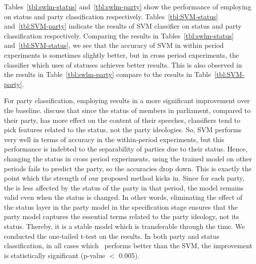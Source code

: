 



Tables~\ref{tbl:swlm-status} and~\ref{tbl:swlm-party} show the performance of employing \acswlm on status and party classification respectively. 
Tables~\ref{tbl:SVM-status} and~\ref{tbl:SVM-party} indicate the results of SVM classifier on status and party classification respectively. Comparing the results in Tables~\ref{tbl:swlm-status} and~\ref{tbl:SVM-status}, we see that the accuracy of SVM in within period experiments is sometimes slightly better, but in cross period experiments, the classifier which uses \acswlm of statuses achieves better results.  This is also observed in the results in Table~\ref{tbl:swlm-party} compare to the results in Table~\ref{tbl:SVM-party}. 
%

For party classification, employing \acswlm results in a more significant improvement over the baseline.  \citet{Hirst:2014} discuss that since the status of members in parliament, compared to their party, has more effect on the content of their speeches, classifiers tend to pick features related to the status, not the party ideologies. So, SVM performs very well in terms of accuracy in the within-period experiments, but this performance is indebted to the separability of parties due to their status. Hence, changing the status in cross period experiments, using the trained model on other periods fails to predict the party, so the accuracies drop down. This is exactly the point which the strength of our proposed method kicks in. 
Since for each party, the \acswlm is less affected by the status of the party in that period, the model remains valid even when the status is changed.  In other words, eliminating the effect of the status layer in the party model in the specification stage ensures that the party model captures the essential terms related to the party ideology, not its status. Thereby, it is a stable model which is transferable through the time.
%
We conducted the one-tailed t-test on the results. In both party and status classification, in all cases which \acswlm\ performs better than the SVM, the improvement is statistically significant ({p-value} $<$ 0.005).


